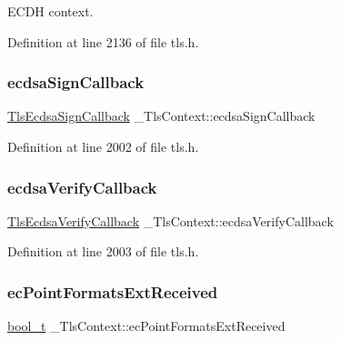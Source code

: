 E\+C\+DH context. 



Definition at line 2136 of file tls.\+h.

\mbox{\label{struct__TlsContext_a8d7f175b8049e525133d306b0ea5c8c6}} 
\subsubsection{\texorpdfstring{ecdsa\+Sign\+Callback}{ecdsaSignCallback}}
{\footnotesize\ttfamily \hyperlink{tls_8h_a6f737cb17e8452166e73c85b7d5a9256}{Tls\+Ecdsa\+Sign\+Callback} \+\_\+\+Tls\+Context\+::ecdsa\+Sign\+Callback}



Definition at line 2002 of file tls.\+h.

\mbox{\label{struct__TlsContext_a857a8388d22d664d36aa857a9265ff04}} 
\subsubsection{\texorpdfstring{ecdsa\+Verify\+Callback}{ecdsaVerifyCallback}}
{\footnotesize\ttfamily \hyperlink{tls_8h_a1d84397a61d8222779e78997e5fdfa53}{Tls\+Ecdsa\+Verify\+Callback} \+\_\+\+Tls\+Context\+::ecdsa\+Verify\+Callback}



Definition at line 2003 of file tls.\+h.

\mbox{\label{struct__TlsContext_a993d2fe15cd5b3a3da55bfbfc5a37f30}} 
\subsubsection{\texorpdfstring{ec\+Point\+Formats\+Ext\+Received}{ecPointFormatsExtReceived}}
{\footnotesize\ttfamily \hyperlink{compiler__port_8h_a812d16e5494522586b3784e55d479912}{bool\+\_\+t} \+\_\+\+Tls\+Context\+::ec\+Point\+Formats\+Ext\+Received}



